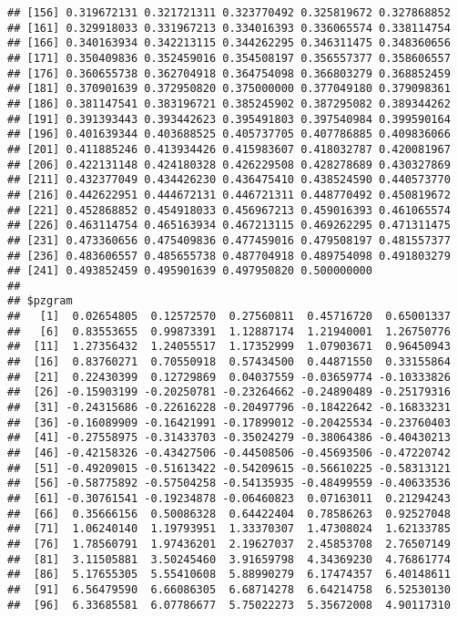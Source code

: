 \documentclass[]{article}
\begin{document}
\begin{verbatim}
## [156] 0.319672131 0.321721311 0.323770492 0.325819672 0.327868852
## [161] 0.329918033 0.331967213 0.334016393 0.336065574 0.338114754
## [166] 0.340163934 0.342213115 0.344262295 0.346311475 0.348360656
## [171] 0.350409836 0.352459016 0.354508197 0.356557377 0.358606557
## [176] 0.360655738 0.362704918 0.364754098 0.366803279 0.368852459
## [181] 0.370901639 0.372950820 0.375000000 0.377049180 0.379098361
## [186] 0.381147541 0.383196721 0.385245902 0.387295082 0.389344262
## [191] 0.391393443 0.393442623 0.395491803 0.397540984 0.399590164
## [196] 0.401639344 0.403688525 0.405737705 0.407786885 0.409836066
## [201] 0.411885246 0.413934426 0.415983607 0.418032787 0.420081967
## [206] 0.422131148 0.424180328 0.426229508 0.428278689 0.430327869
## [211] 0.432377049 0.434426230 0.436475410 0.438524590 0.440573770
## [216] 0.442622951 0.444672131 0.446721311 0.448770492 0.450819672
## [221] 0.452868852 0.454918033 0.456967213 0.459016393 0.461065574
## [226] 0.463114754 0.465163934 0.467213115 0.469262295 0.471311475
## [231] 0.473360656 0.475409836 0.477459016 0.479508197 0.481557377
## [236] 0.483606557 0.485655738 0.487704918 0.489754098 0.491803279
## [241] 0.493852459 0.495901639 0.497950820 0.500000000
## 
## $pzgram
##   [1]  0.02654805  0.12572570  0.27560811  0.45716720  0.65001337
##   [6]  0.83553655  0.99873391  1.12887174  1.21940001  1.26750776
##  [11]  1.27356432  1.24055517  1.17352999  1.07903671  0.96450943
##  [16]  0.83760271  0.70550918  0.57434500  0.44871550  0.33155864
##  [21]  0.22430399  0.12729869  0.04037559 -0.03659774 -0.10333826
##  [26] -0.15903199 -0.20250781 -0.23264662 -0.24890489 -0.25179316
##  [31] -0.24315686 -0.22616228 -0.20497796 -0.18422642 -0.16833231
##  [36] -0.16089909 -0.16421991 -0.17899012 -0.20425534 -0.23760403
##  [41] -0.27558975 -0.31433703 -0.35024279 -0.38064386 -0.40430213
##  [46] -0.42158326 -0.43427506 -0.44508506 -0.45693506 -0.47220742
##  [51] -0.49209015 -0.51613422 -0.54209615 -0.56610225 -0.58313121
##  [56] -0.58775892 -0.57504258 -0.54135935 -0.48499559 -0.40633536
##  [61] -0.30761541 -0.19234878 -0.06460823  0.07163011  0.21294243
##  [66]  0.35666156  0.50086328  0.64422404  0.78586263  0.92527048
##  [71]  1.06240140  1.19793951  1.33370307  1.47308024  1.62133785
##  [76]  1.78560791  1.97436201  2.19627037  2.45853708  2.76507149
##  [81]  3.11505881  3.50245460  3.91659798  4.34369230  4.76861774
##  [86]  5.17655305  5.55410608  5.88990279  6.17474357  6.40148611
##  [91]  6.56479590  6.66086305  6.68714278  6.64214758  6.52530130
##  [96]  6.33685581  6.07786677  5.75022273  5.35672008  4.90117310

\end{verbatim}
\end{document}
